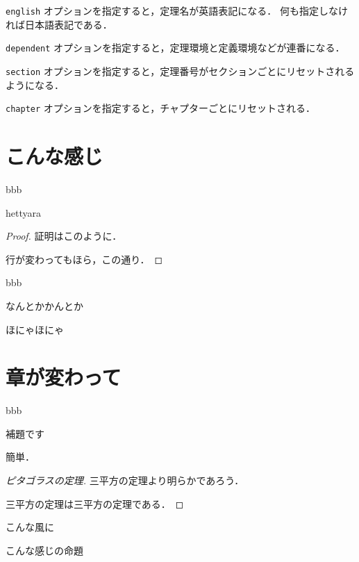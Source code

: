 \documentclass{jsarticle}
\begin{document}
\begin{theo}
\texttt{english} オプションを指定すると，定理名が英語表記になる．
何も指定しなければ日本語表記である．
\end{theo}

\begin{lemma}[依存パラメータ指定]
\texttt{dependent} オプションを指定すると，定理環境と定義環境などが連番になる．
\end{lemma}

\begin{theo}
\texttt{section} オプションを指定すると，定理番号がセクションごとにリセットされるようになる．
\end{theo}

\begin{corol}
\texttt{chapter} オプションを指定すると，チャプターごとにリセットされる．
\end{corol}

\section{こんな感じ}
\begin{defi}
bbb
\end{defi}

\begin{theo}[nanntyara]
hettyara
\end{theo}

\begin{proof}
証明はこのように．

行が変わってもほら，この通り．
\end{proof}

\begin{defi}[aaa]
bbb
\end{defi}

\begin{exam}
なんとかかんとか
\item ほにゃほにゃ
\end{exam}

\section{章が変わって}
\begin{defi}
bbb
\end{defi}

\begin{theo}[ピタゴラス]

\end{theo}

\begin{lemma}
補題です
\end{lemma}

\begin{shortproof}[補題]
簡単．
\end{shortproof}

\begin{proof}[ピタゴラスの定理]
三平方の定理より明らかであろう．

三平方の定理は三平方の定理である．
\end{proof}

\begin{corol}
こんな風に
\end{corol}

\begin{propo}
こんな感じの命題
\end{propo}
\end{document}
